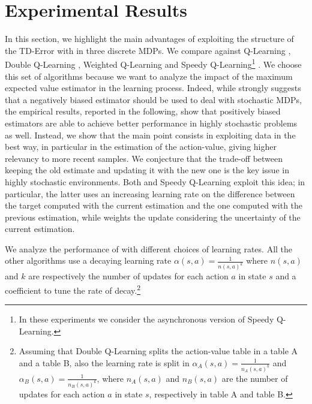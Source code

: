 \documentclass[conference]{IEEEtran}
\begin{document}
\section{Experimental Results}\label{S:empirical}
In this section, we highlight the main advantages of exploiting the structure of the TD-Error with \alg in three discrete MDPs. We compare \alg against Q-Learning \cite{watkins1992q}, Double Q-Learning \cite{van2010double}, Weighted Q-Learning \cite{d2016estimating} and Speedy Q-Learning\footnote{In these experiments we consider the asynchronous version of Speedy Q-Learning.} \cite{NIPS2011_4251}. We choose this set of algorithms because we want to analyze the impact of the maximum expected value estimator in the learning process. Indeed, while \cite{van2010double} strongly suggests that a negatively biased estimator should be used to deal with stochastic MDPs, the  empirical results, reported in the following, show that positively biased estimators are able to achieve better performance in highly stochastic problems as well. Instead, we show that the main point consists in exploiting data in the best way, in particular in the estimation of the action-value, giving higher relevancy to more recent samples. We conjecture that the trade-off between keeping the old estimate and updating it with the new one is the key issue in highly stochastic environments. Both \alg and Speedy Q-Learning exploit this idea; in particular, the latter uses an increasing learning rate on the difference between the target computed with the current estimation and the one computed with the previous estimation, while \alg weights the update considering the uncertainty of the current estimation.

We analyze the performance of \alg with different choices of learning rates. All the other algorithms use a decaying learning rate $\alpha(s, a) = \frac{1}{n(s, a)^{k}}$ where $n(s, a)$ and $k$ are respectively the number of updates for each action $a$ in state $s$ and a coefficient to tune the rate of decay.\footnote{Assuming that Double Q-Learning splits the action-value table in a table A and a table B, also the learning rate is split in $\alpha_A(s, a) = \frac{1}{n_A(s, a)^{k}}$ and $\alpha_B(s, a) = \frac{1}{n_B(s, a)^{k}}$, where $n_A(s, a)$ and $n_B(s, a)$ are the number of updates for each action $a$ in state $s$, respectively in table A and table B.}
\end{document}

